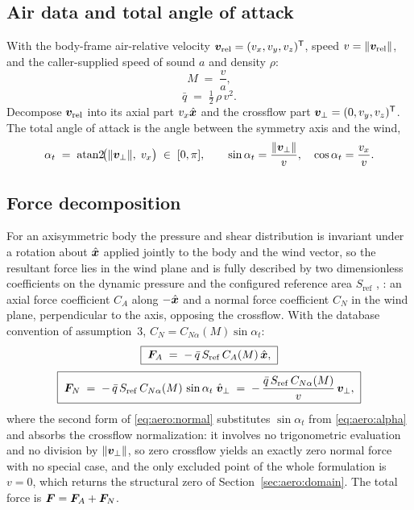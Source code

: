 \subsection{Air data and total angle of attack}

With the body-frame air-relative velocity $\bm{v}_{\mathrm{rel}} =
(v_x, v_y, v_z)^{\mathsf T}$, speed
$v = \lVert \bm{v}_{\mathrm{rel}} \rVert$, and the caller-supplied speed
of sound $a$ and density $\rho$:
\begin{equation}
  M \;=\; \frac{v}{a},
  \label{eq:aero:mach}
\end{equation}
\begin{equation}
  \bar{q} \;=\; \tfrac{1}{2}\, \rho\, v^2 .
  \label{eq:aero:qbar}
\end{equation}
Decompose $\bm{v}_{\mathrm{rel}}$ into its axial part $v_x \hat{\bm{x}}$
and the crossflow part
$\bm{v}_\perp = (0, v_y, v_z)^{\mathsf T}$. The total angle of attack is
the angle between the symmetry axis and the wind,
\begin{equation}
  \alpha_t \;=\; \operatorname{atan2}\!\bigl(
    \lVert \bm{v}_\perp \rVert,\; v_x \bigr)
  \;\in\; [0, \pi],
  \qquad
  \sin\alpha_t = \frac{\lVert \bm{v}_\perp \rVert}{v}, \quad
  \cos\alpha_t = \frac{v_x}{v}.
  \label{eq:aero:alpha}
\end{equation}

\subsection{Force decomposition}

For an axisymmetric body the pressure and shear distribution is invariant
under a rotation about $\hat{\bm{x}}$ applied jointly to the body and the
wind vector, so the resultant force lies in the wind plane and is fully
described by two dimensionless coefficients on the dynamic pressure and
the configured reference area $S_{\mathrm{ref}}$
\cite[Sect.~3.5]{montenbruck2000}, \cite[Sect.~8.6.2]{vallado2013}: an
axial force coefficient $C_A$ along $-\hat{\bm{x}}$ and a normal force
coefficient $C_N$ in the wind plane, perpendicular to the axis, opposing
the crossflow. With the database convention of assumption~3,
$C_N = C_{N\alpha}(M) \sin\alpha_t$:
\begin{equation}
  \boxed{\;
  \bm{F}_A \;=\; -\,\bar{q}\, S_{\mathrm{ref}}\, C_A(M)\, \hat{\bm{x}},
  \;}
  \label{eq:aero:axial}
\end{equation}
\begin{equation}
  \boxed{\;
  \bm{F}_N \;=\; -\,\bar{q}\, S_{\mathrm{ref}}\, C_{N\alpha}(M)\,
    \sin\alpha_t\; \hat{\bm{v}}_\perp
  \;=\; -\,\frac{\bar{q}\, S_{\mathrm{ref}}\, C_{N\alpha}(M)}{v}\,
    \bm{v}_\perp ,
  \;}
  \label{eq:aero:normal}
\end{equation}
where the second form of \eqref{eq:aero:normal} substitutes
$\sin\alpha_t$ from \eqref{eq:aero:alpha} and absorbs the crossflow
normalization: it involves no trigonometric evaluation and no division by
$\lVert \bm{v}_\perp \rVert$, so zero crossflow yields an exactly zero
normal force with no special case, and the only excluded point of the
whole formulation is $v = 0$, which returns the structural zero of
Section~\ref{sec:aero:domain}. The total force is
$\bm{F} = \bm{F}_A + \bm{F}_N$.

